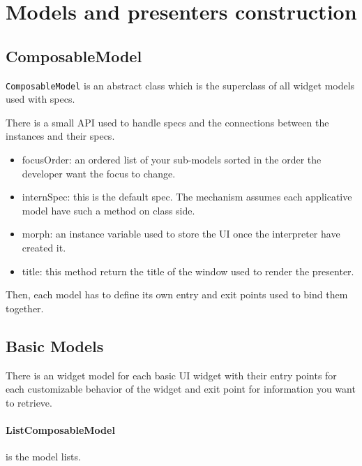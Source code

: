 \documentclass[a4paper,10pt,twoside]{book}
\begin{document}
\section{Models and presenters construction}

\subsection{ComposableModel}

\verb+ComposableModel+ is an abstract class which is the superclass of all widget models used with specs.

There is a small API used to handle specs and the connections between the instances and their specs.

\begin{itemize}
	\item focusOrder: an ordered list of your sub-models sorted in the order the developer want the focus to change.
	\item internSpec: this is the default spec. The mechanism assumes each applicative model have such a method on class side.
	\item morph: an instance variable used to store the UI once the interpreter have created it.	
	\item title: this method return the title of the window used to render the presenter.
\end{itemize}

Then, each model has to define its own entry and exit points used to bind them together.

\subsection{Basic Models}

There is an widget model for each basic UI widget  with their entry points for each customizable behavior of the widget and exit point for information you want to retrieve.

\paragraph{ListComposableModel} is the model lists.
\end{document}

